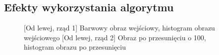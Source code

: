 \documentclass[a4paper,12pt, titlepage]{report}
\begin{document}
\subsection*{Efekty wykorzystania algorytmu}
\begin{figure}[h]
    \centering
    \qquad
    \caption{[Od lewej, rząd 1] Barwowy obraz wejściowy, histogram obrazu wejściowego [Od lewej, rząd 2] Obraz po przesunięciu o 100, histogram obrazu po przesunięciu}%
    \label{fig:rysunek}%
\end{figure}
\end{document}
